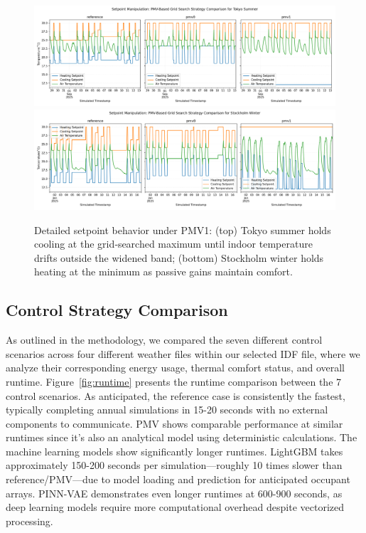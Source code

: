 \begin{figure}[h!]
    \centering
    \includegraphics[width=0.75\linewidth]{figs/realcontrol_tk.png}
    \includegraphics[width=0.75\linewidth]{figs/realcontrol_st.png}
    \caption{Detailed setpoint behavior under PMV1: (top) Tokyo summer holds cooling at the grid‐searched maximum until indoor temperature drifts outside the widened band; (bottom) Stockholm winter holds heating at the minimum as passive gains maintain comfort.}
    \label{fig:zoomed-tkst}
\end{figure}

\subsection{Control Strategy Comparison}
\label{sec:all_control_strategies}
As outlined in the methodology, we compared the seven different control scenarios across four different weather files within our selected IDF file, where we analyze their corresponding energy usage, thermal comfort status, and overall runtime. Figure~\ref{fig:runtime} presents the runtime comparison between the 7 control scenarios. As anticipated, the reference case is consistently the fastest, typically completing annual simulations in 15-20 seconds with no external components to communicate. PMV shows comparable performance at similar runtimes since it's also an analytical model using deterministic calculations. The machine learning models show significantly longer runtimes. LightGBM takes approximately 150-200 seconds per simulation—roughly 10 times slower than reference/PMV—due to model loading and prediction for anticipated occupant arrays. PINN-VAE demonstrates even longer runtimes at 600-900 seconds, as deep learning models require more computational overhead despite vectorized processing.

